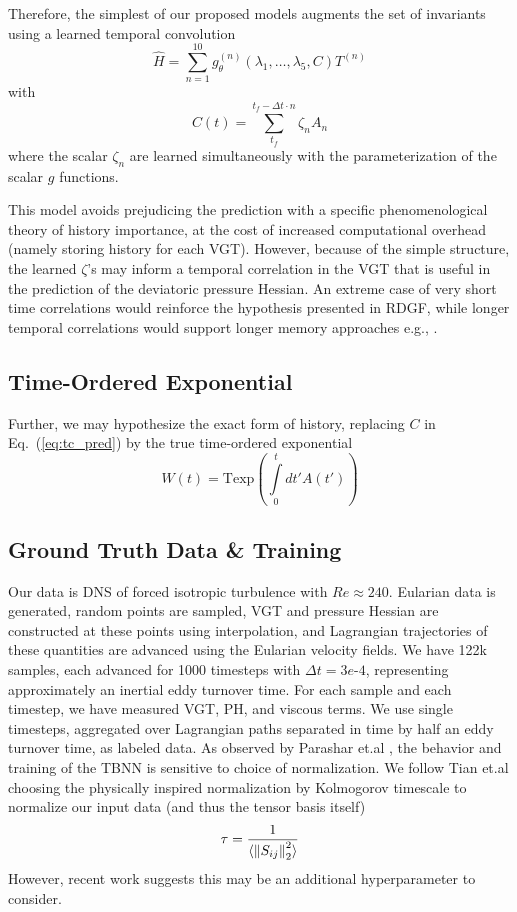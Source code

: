 Therefore, the simplest of our proposed models augments the set of invariants using a learned temporal convolution
\begin{equation} \label{eq:tc_pred}
  \hat{H} = \sum_{n=1}^{10} g_\theta^{(n)}(\lambda_1, \dots, \lambda_5, C)T^{(n)}
\end{equation}
with
\begin{equation}
    C(t) = \sum_{t_f}^{t_f-\Delta t \cdot n} \zeta_n A_n
\end{equation}
where the scalar $\zeta_n$ are learned simultaneously with the parameterization of the scalar $g$ functions.

This model avoids prejudicing the prediction with a specific phenomenological theory of history importance, at the cost of increased computational overhead (namely storing history for each VGT). However, because of the simple structure, the learned $\zeta$'s may inform a temporal correlation in the VGT that is useful in the prediction of the deviatoric pressure Hessian. An extreme case of very short time correlations would reinforce the hypothesis presented in RDGF, while longer temporal correlations would support longer memory approaches e.g., \cite{tian2021_MZ}.

\subsection{Time-Ordered Exponential}
Further, we may hypothesize the exact form of history, replacing $C$ in Eq.~(\ref{eq:tc_pred}) by the true time-ordered exponential 
\begin{equation}
    W(t) = \text{Texp}\left(\int\limits_0^t dt' A(t')\right)
\end{equation}

\subsection{Ground Truth Data \& Training}
Our data is DNS of forced isotropic turbulence with $Re \approx 240$. Eularian data is generated, random points are sampled, VGT and pressure Hessian are constructed at these points using interpolation, and Lagrangian trajectories of these quantities are advanced using the Eularian velocity fields. We have 122k samples, each advanced for 1000 timesteps with $\Delta t = 3e\text{-}4$, representing approximately an inertial eddy turnover time. For each sample and each timestep, we have measured VGT, PH, and viscous terms. We use single timesteps, aggregated over Lagrangian paths separated in time by half an eddy turnover time, as labeled data. As observed by Parashar et.al \cite{parashar2020modeling}, the behavior and training of the TBNN is sensitive to choice of normalization. We follow Tian et.al choosing the physically inspired normalization by Kolmogorov timescale to normalize our input data (and thus the tensor basis itself)
\begin{equation}
  \tau = \frac{1}{\langle \left\lVert S_{ij}\right\rVert_2^2 \rangle}
\end{equation}
However, recent work suggests this may be an additional hyperparameter to consider\cite{hyett2022applicability}.


